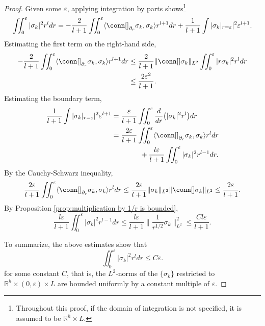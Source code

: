 \documentclass[12pt, reqno]{amsart}
\theoremstyle{plain} %
\theoremstyle{definition}
\theoremstyle{remark}
\numberwithin{equation}{section}
\newcommand{\norm}[1]{\lVert #1 \rVert}
\newcommand{\pnorm}[1]{| #1 |}
\newcommand{\field}[1]{\mathbb{#1}}
\newcommand{\R}{\field{R}}
\newcommand{\inner}[1]{\langle #1 \rangle}
\newcommand{\hdim}{h} %
\newcommand{\ldim}{l} %
\begin{document}
\begin{proof}
    Given some \(\varepsilon\), applying integration by parts shows\footnote{Throughout this proof, if the domain of integration is not specified, it is assumed to be \(\R^\hdim \times L.\)}
    \begin{equation*}
        \iint_{0}^{\varepsilon} \pnorm{\sigma_k}^2 r^\ldim dr = -\frac{2}{\ldim+1} \iint_{0}^{\varepsilon} \inner{\conn[]_{\partial_r} \sigma_k, \sigma_k} r^{\ldim+1} dr + \frac{1}{\ldim+1} \int \pnorm{\sigma_k|_{r=\varepsilon}}^2 \varepsilon^{\ldim+1}.
    \end{equation*}
    Estimating the first term on the right-hand side,
    \begin{align*}
        -\frac{2}{\ldim+1} \iint_{0}^{\varepsilon} \inner{\conn[]_{\partial_r} \sigma_k, \sigma_k} r^{\ldim+1} dr &\leq \frac{2}{\ldim+1} \norm{\conn[] \sigma_k}_{L^2} \iint_0^\varepsilon \pnorm{r\sigma_k}^2 r^l dr  \\
        &\leq \frac{2 \varepsilon^2}{\ldim+1}.
    \end{align*}
    Estimating the boundary term,
    \begin{align*}
        \frac{1}{\ldim+1} \int \pnorm{\sigma_k|_{r=\varepsilon}}^2 \varepsilon^{\ldim+1} &= \frac{\varepsilon}{\ldim+1} \iint_{0}^{\varepsilon} \frac{d}{dr} \big(\pnorm{\sigma_k}^2 r^\ldim\big) dr \\
        &= \frac{2\varepsilon}{\ldim+1} \iint_{0}^{\varepsilon} \inner{\conn[]_{\partial_r} \sigma_k, \sigma_k} r^\ldim dr \\
        &\qquad\qquad + \frac{l\varepsilon}{\ldim+1} \iint_{0}^{\varepsilon} \pnorm{\sigma_k}^2 r^{\ldim-1} dr.
    \end{align*}
    By the Cauchy-Schwarz inequality,
    \begin{equation*}
        \frac{2\varepsilon}{\ldim+1} \iint_{0}^{\varepsilon} \inner{\conn[]_{\partial_r} \sigma_k, \sigma_k} r^\ldim dr \leq \frac{2\varepsilon}{\ldim+1} \norm{\sigma_k}_{L^2} \norm{\conn[] \sigma_k}_{L^2} \leq \frac{2\varepsilon}{\ldim+1}.
    \end{equation*}
    By Proposition \ref{prop:multiplication by 1/r is bounded},
    \begin{equation*}
        \frac{l\varepsilon}{\ldim+1} \iint_{0}^{\varepsilon} \pnorm{\sigma_k}^2 r^{\ldim-1} dr \leq \frac{l\varepsilon}{\ldim+1} \norm{\frac{1}{r^{1/2}} \sigma_k}_{L^2}^2 \leq \frac{Cl\varepsilon}{\ldim+1}.
    \end{equation*}

    To summarize, the above estimates show that
    \begin{equation}\label{eqn:L^1 compactness estimate}
        \iint_{0}^{\varepsilon} \pnorm{\sigma_k}^2 r^\ldim dr \leq C \varepsilon.
    \end{equation}
    for some constant \(C\), that is, the \(L^2\)-norms of the \(\{\sigma_k\}\) restricted to \(\R^\hdim \times (0, \varepsilon) \times L\) are bounded uniformly by a constant multiple of \(\varepsilon\).


\end{proof}
\end{document}
